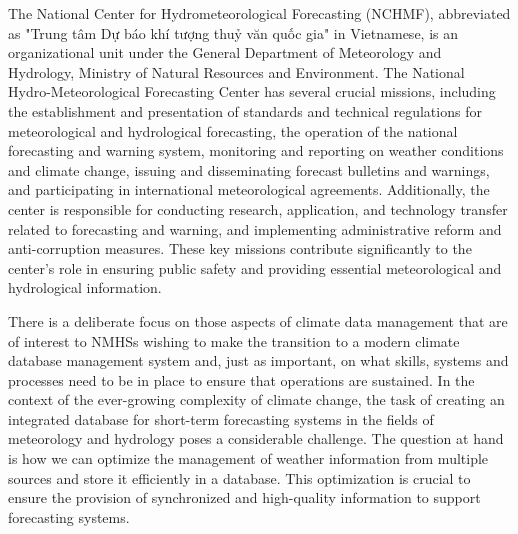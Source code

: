 

The National Center for Hydrometeorological Forecasting (NCHMF), abbreviated as "Trung tâm Dự báo khí tượng thuỷ văn quốc gia" in Vietnamese, is an organizational unit under the General Department of Meteorology and Hydrology, Ministry of Natural Resources and Environment\cite{NMHS}. The National Hydro-Meteorological Forecasting Center has several crucial missions, including the establishment and presentation of standards and technical regulations for meteorological and hydrological forecasting, the operation of the national forecasting and warning system, monitoring and reporting on weather conditions and climate change, issuing and disseminating forecast bulletins and warnings, and participating in international meteorological agreements. Additionally, the center is responsible for conducting research, application, and technology transfer related to forecasting and warning, and implementing administrative reform and anti-corruption measures. These key missions contribute significantly to the center's role in ensuring public safety and providing essential meteorological and hydrological information.

There is a deliberate focus on those aspects of climate data management that are of interest to
NMHSs wishing to make the transition to a modern climate database management system and,
just as important, on what skills, systems and processes need to be in place to ensure that
operations are sustained. In the context of the ever-growing complexity of climate change, the task of creating an integrated database for short-term forecasting systems in the fields of meteorology and hydrology poses a considerable challenge. The question at hand is how we can optimize the management of weather information from multiple sources and store it efficiently in a database. This optimization is crucial to ensure the provision of synchronized and high-quality information to support forecasting systems.
